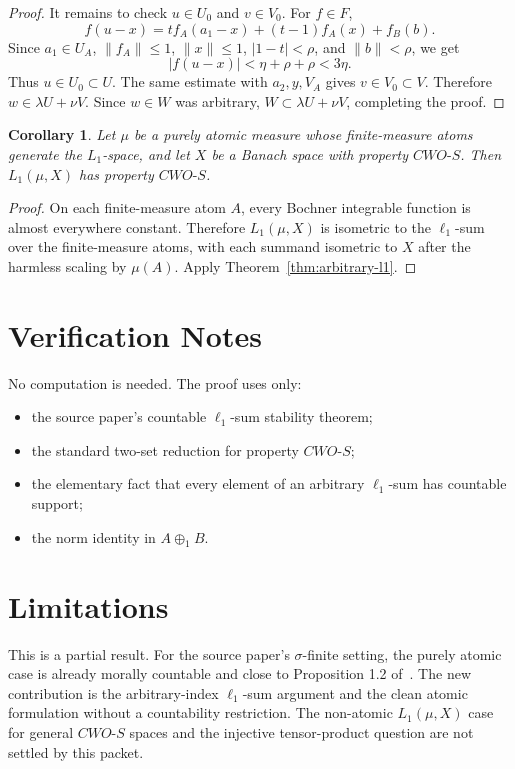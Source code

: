 \documentclass[11pt]{article}
\newtheorem{corollary}{Corollary}
\newcommand{\CWOS}{\textit{CWO-S}}
\begin{document}
\begin{proof}
It remains to check \(u\in U_0\) and \(v\in V_0\).  For \(f\in F\),
\[
  f(u-x)=t f_A(a_1-x)+(t-1)f_A(x)+f_B(b).
\]
Since \(a_1\in U_A\), \(\|f_A\|\le1\), \(\|x\|\le1\), \(|1-t|<\rho\), and
\(\|b\|<\rho\), we get
\[
  |f(u-x)|<\eta+\rho+\rho<3\eta.
\]
Thus \(u\in U_0\subset U\).  The same estimate with \(a_2,y,V_A\) gives
\(v\in V_0\subset V\).  Therefore \(w\in\lambda U+\nu V\).  Since
\(w\in W\) was arbitrary, \(W\subset\lambda U+\nu V\), completing the proof.
\end{proof}

\begin{corollary}\label{cor:atomic}
Let \(\mu\) be a purely atomic measure whose finite-measure atoms generate the
\(L_1\)-space, and let \(X\) be a Banach space with property \(\CWOS\).  Then
\(L_1(\mu,X)\) has property \(\CWOS\).
\end{corollary}

\begin{proof}
On each finite-measure atom \(A\), every Bochner integrable function is
almost everywhere constant.  Therefore \(L_1(\mu,X)\) is isometric to the
\(\ell_1\)-sum over the finite-measure atoms, with each summand isometric to
\(X\) after the harmless scaling by \(\mu(A)\).  Apply
Theorem~\ref{thm:arbitrary-l1}.
\end{proof}

\section*{Verification Notes}

No computation is needed.  The proof uses only:
\begin{itemize}
  \item the source paper's countable \(\ell_1\)-sum stability theorem;
  \item the standard two-set reduction for property \(\CWOS\);
  \item the elementary fact that every element of an arbitrary \(\ell_1\)-sum
        has countable support;
  \item the norm identity in \(A\oplus_1 B\).
\end{itemize}

\section*{Limitations}

This is a partial result.  For the source paper's \(\sigma\)-finite setting,
the purely atomic case is already morally countable and close to Proposition
1.2 of~\cite{HKP25}.  The new contribution is the arbitrary-index
\(\ell_1\)-sum argument and the clean atomic formulation without a countability
restriction.  The non-atomic \(L_1(\mu,X)\) case for general \(\CWOS\) spaces
and the injective tensor-product question are not settled by this packet.
\end{document}
